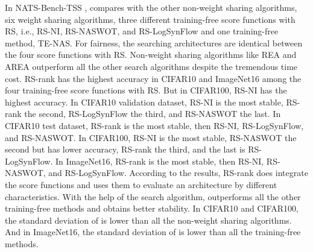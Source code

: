 \documentclass[sigconf]{acmart}
\begin{document}
    In NATS-Bench-TSS \cite{Dong_2021},  compares \palg{} with the other 
    non-weight sharing algorithms, six weight sharing algorithms, three different training-free 
    score functions with RS, i.e., RS-NI, RS-NASWOT, and RS-LogSynFlow and one training-free method, 
    TE-NAS. For fairness, the searching architectures are identical between the four score 
    functions with RS. Non-weight sharing algorithms like REA and AREA outperform all the other 
    search algorithms despite the tremendous time cost. RS-rank has the highest accuracy in CIFAR10 
    and ImageNet16 among the four training-free score functions with RS. But in CIFAR100, RS-NI has the highest accuracy. 
    In CIFAR10 validation dataset, RS-NI is the most stable, RS-rank the second, RS-LogSynFlow the 
    third, and RS-NASWOT the last. In CIFAR10 test dataset, RS-rank is the most stable, then RS-NI, 
    RS-LogSynFlow, and RS-NASWOT. In CIFAR100, RS-NI is the most stable, RS-NASWOT the second but 
    has lower accuracy, RS-rank the third, and the last is RS-LogSynFlow. In ImageNet16, RS-rank is the 
    most stable, then RS-NI, RS-NASWOT, and RS-LogSynFlow. According to the results, RS-rank does 
    integrate the score functions and uses them to evaluate an architecture by different characteristics. 
    With the help of the search algorithm, \palg{} outperforms all the other training-free methods 
    and obtains better stability. In CIFAR10 and CIFAR100, the standard deviation of \palg{} is lower 
    than all the non-weight sharing algorithms. And in ImageNet16, the standard deviation of \palg{} is 
    lower than all the training-free methods. 
\end{document}
